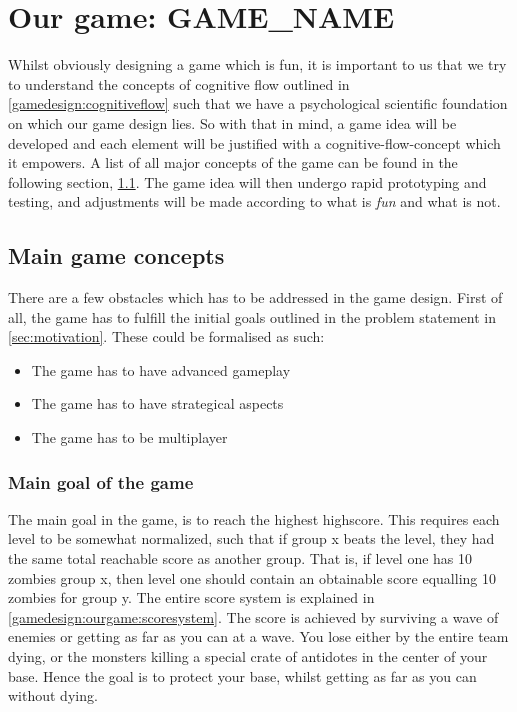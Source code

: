 \section{Our game: GAME\_NAME}

Whilst obviously designing a game which is fun, it is important to us that we try to understand the concepts of cognitive flow outlined in \ref{gamedesign:cognitiveflow} such that we have a psychological scientific foundation on which our game design lies. 
So with that in mind, a game idea will be developed and each element will be justified with a cognitive-flow-concept which it empowers. A list of all major concepts of the game can be found in the following section, \ref{gamedesign:maingameconcepts}. 
The game idea will then undergo rapid prototyping and testing, and adjustments will be made according to what is \emph{fun} and what is not.  

\subsection{Main game concepts}\label{gamedesign:maingameconcepts}
There are a few obstacles which has to be addressed in the game design. First of all, the game has to fulfill the initial goals outlined in the problem statement in \ref{sec:motivation}. These could be formalised as such:

\begin{itemize}
\item The game has to have advanced gameplay
\item The game has to have strategical aspects
\item The game has to be multiplayer
\end{itemize}

\subsubsection{Main goal of the game}
The main goal in the game, is to reach the highest highscore. This requires each level to be somewhat normalized, such that if group x beats the level, they had the same total reachable score as another group. That is, if level one has 10 zombies group x, then level one should contain an obtainable score equalling 10 zombies for group y. The entire score system is explained in \ref{gamedesign:ourgame:scoresystem}. The score is achieved by surviving a wave of enemies or getting as far as you can at a wave. You lose either by the entire team dying, or the monsters killing a special crate of antidotes in the center of your base. Hence the goal is to protect your base, whilst getting as far as you can without dying.

